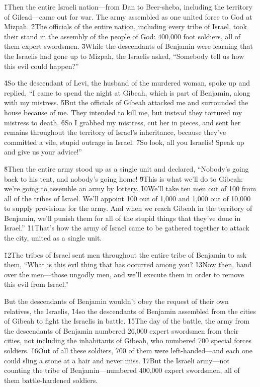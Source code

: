 \v{1}Then the entire Israeli nation---from Dan to Beer-sheba, including the territory of Gilead---came out for war. The army assembled as one united force to God at Mizpah. \v{2}The officials of the entire nation, including every tribe of Israel, took their stand in the assembly of the people of God: 400,000 foot soldiers, all of them expert swordsmen. \v{3}While the descendants of Benjamin were learning that the Israelis had gone up to Mizpah, the Israelis asked, ``Somebody tell us how this evil could happen?''

\v{4}So the descendant of Levi, the husband of the murdered woman, spoke up and replied, ``I came to spend the night at Gibeah, which is part of Benjamin, along with my mistress. \v{5}But the officials of Gibeah attacked me and surrounded the house because of me. They intended to kill me, but instead they tortured my mistress to death. \v{6}So I grabbed my mistress, cut her in pieces, and sent her remains throughout the territory of Israel's inheritance, because they've committed a vile, stupid outrage in Israel. \v{7}So look, all you Israelis! Speak up and give us your advice!''

\v{8}Then the entire army stood up as a single unit and declared, ``Nobody's going back to his tent, and nobody's going home! \v{9}This is what we'll do to Gibeah: we're going to assemble an army by lottery. \v{10}We'll take ten men out of 100 from all of the tribes of Israel. We'll appoint 100 out of 1,000 and 1,000 out of 10,000 to supply provisions for the army. And when we reach Gibeah in the territory of Benjamin, we'll punish them for all of the stupid things that they've done in Israel.'' \v{11}That's how the army of Israel came to be gathered together to attack the city, united as a single unit.

\v{12}The tribes of Israel sent men throughout the entire tribe of Benjamin to ask them, ``What is this evil thing that has occurred among you? \v{13}Now then, hand over the men---those ungodly men, and we'll execute them in order to remove this evil from Israel.''

But the descendants of Benjamin wouldn't obey the request of their own relatives, the Israelis, \v{14}so the descendants of Benjamin assembled from the cities of Gibeah to fight the Israelis in battle. \v{15}The day of the battle, the army from the descendants of Benjamin numbered 26,000 expert swordsmen from their cities, not including the inhabitants of Gibeah, who numbered 700 special forces soldiers. \v{16}Out of all these soldiers, 700 of them were left-handed---and each one could sling a stone at a hair and never miss. \v{17}But the Israeli army---not counting the tribe of Benjamin---numbered 400,000 expert swordsmen, all of them battle-hardened soldiers.

